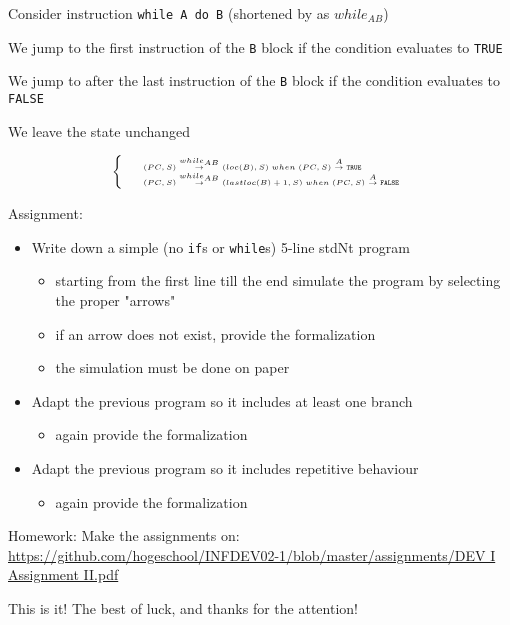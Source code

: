 \documentclass{beamer}
\begin{document}
\begin{slide}{
\item Consider instruction \texttt{while A do B} (shortened by as $while_{AB}$)
\pause
\item We jump to the first instruction of the \texttt{B} block if the condition evaluates to \texttt{TRUE}
\pause
\item We jump to after the last instruction of the \texttt{B} block if the condition evaluates to \texttt{FALSE}
\pause
\item We leave the state unchanged
\pause

$$
\tiny
\left\lbrace
\begin{array}{l l}
&(PC,S) \overset{while_{AB}}{\rightarrow} (loc(B),S) \; when \; (PC,S) \overset{A}{\rightarrow} \mathtt{TRUE} \\
&(PC,S) \overset{while_{AB}}{\rightarrow} (lastloc(B)+1,S) \; when \; (PC,S) \overset{A}{\rightarrow} \mathtt{FALSE} \\
\end{array}
\right.
$$

}\end{slide}

\begin{frame}{Assignment:}
\begin{itemize}
    \item Write down a simple (no \texttt{if}s or \texttt{while}s) 5-line stdNt program
    \begin{itemize}
            \item starting from the first line till the end simulate the program by selecting the proper "arrows"
            \item if an arrow does not exist, provide the formalization
            \item the simulation must be done on paper
    \end{itemize}
    \item Adapt the previous program so it includes at least one branch
    \begin{itemize}
            \item again provide the formalization
    \end{itemize}
    \item Adapt the previous program so it includes repetitive behaviour
    \begin{itemize}
            \item again provide the formalization
    \end{itemize}
\end{itemize}
\end{frame}

\begin{frame}{Homework:}
Make the assignments on: \url{https://github.com/hogeschool/INFDEV02-1/blob/master/assignments/DEV I Assignment II.pdf}
\end{frame}


\begin{frame}{This is it!}
\center
\fontsize{18pt}{7.2}\selectfont
The best of luck, and thanks for the attention!
\end{frame}
\end{document}
